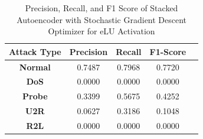 \documentclass[12pt, a4paper]{report}
\begin{document}
\begin{table}[ht]
\centering
\captionsetup{justification=centering,margin=2cm}
\begin{tabular}{|c|c|c|c|c|}
\hline
\multicolumn{1}{|c|}{\textbf{Attack Type}} & \multicolumn{1}{c|}{\textbf{Precision}} & \multicolumn{1}{c|}{\textbf{Recall}} & \multicolumn{1}{c|}{\textbf{F1-Score}} \\ \hline
\textbf{Normal}        & 0.7487                                   & 0.7968                                & 0.7720                                                                  \\ \hline
\textbf{DoS}           & 0.0000                                  & 0.0000                                &  0.0000                                                                    \\ \hline
\textbf{Probe}         & 0.3399                                  & 0.5675                                & 0.4252                                                                  \\ \hline
\textbf{U2R}           & 0.0627                                    & 0.3186                                & 0.1048                                                                   \\ \hline
\textbf{R2L}           & 0.0000                                      & 0.0000                                   & 0.0000                                                            \\ \hline         \end{tabular}
\caption{Precision, Recall, and F1 Score of Stacked Autoencoder with Stochastic Gradient Descent Optimizer for eLU Activation}
\label{prf1_sgd_elu_auto}
\end{table}
\end{document}
